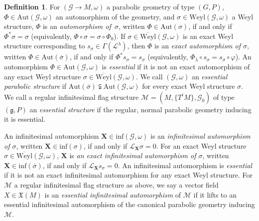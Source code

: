 \documentclass[pdftex]{sigma}
\def\g{\mathfrak{g}}
\def\Gbdle{\mathcal{G}}
\def\VF{\mathfrak{X}}
\theoremstyle{plain}
\theoremstyle{definition}
\newtheorem{Definition}{Definition}[section]
\begin{document}
\begin{Definition} \label{parabolic essential definition} For $(\Gbdle \rightarrow M,\omega)$ a parabolic geometry of type $(G,P)$, $\Phi \in \mathrm{Aut}(\Gbdle,\omega)$ an automorphism of the geometry, and $\sigma \in \mathrm{Weyl}(\Gbdle,\omega)$ a Weyl structure, $\Phi$ is an \emph{automorphism of~$\sigma$}, written $\Phi \in \mathrm{Aut}(\sigma)$, if and only if $\Phi^*\sigma = \sigma$ (equivalently, $\Phi \circ \sigma = \sigma \circ \Phi_0$). If $\sigma \in \overline{\mathrm{Weyl}}(\Gbdle,\omega)$ is an exact Weyl structure corresponding to $s_{\sigma} \in \Gamma(\mathcal{L}^{\lambda})$, then $\Phi$ is an \emph{exact automorphism of $\sigma$}, written $\Phi \in \mathrm{Aut}(\overline{\sigma})$, if and only if $\Phi^*s_{\sigma} = s_{\sigma}$ (equivalently, $\Phi_{\lambda} \circ s_{\sigma} = s_{\sigma} \circ \varphi$). An automorphism $\Phi \in \mathrm{Aut}(\Gbdle,\omega)$ is \emph{essential} if it is not an exact automorphism of any exact Weyl structure $\sigma \in \overline{\mathrm{Weyl}}(\Gbdle,\omega)$. We call $(\Gbdle,\omega)$ an \emph{essential parabolic structure} if $\mathrm{Aut}(\overline{\sigma}) \subsetneqq \mathrm{Aut}(\Gbdle,\omega)$ for every exact Weyl structure $\sigma$. We call a regular inf\/initesimal f\/lag structure $\mathcal{M} = (M,\{T^iM\},\Gbdle_0)$ of type $(\g,P)$ an \emph{essential structure} if the regular, normal parabolic geometry inducing it is essential.


An inf\/initesimal automorphism $\mathbf{X} \in \mathrm{inf}(\Gbdle,\omega)$ is an \emph{infinitesimal automorphism of $\sigma$}, written $\mathbf{X} \in \mathrm{inf}(\sigma)$, if and only if $\mathcal{L}_{\mathbf{X}} \sigma = 0$. For an exact Weyl structure $\sigma \in \overline{\mathrm{Weyl}}(\Gbdle,\omega)$, $\mathbf{X}$ is \emph{an exact infinitesimal automorphism of $\sigma$}, written $\mathbf{X} \in \mathrm{inf}(\overline{\sigma})$, if and only if $\mathcal{L}_{\mathbf{X}} s_{\sigma} = 0$. An inf\/initesimal automorphism is \emph{essential} if it is not an exact inf\/initesimal automorphism for any exact Weyl structure. For $\mathcal{M}$ a regular inf\/initesimal f\/lag structure as above, we say a vector f\/ield $X \in \VF(M)$ is an \emph{essential infinitesimal automorphism} of $\mathcal{M}$ if it lifts to an essential inf\/initesimal automorphism of the canonical parabolic geometry inducing $\mathcal{M}$.
\end{Definition}
\end{document}
